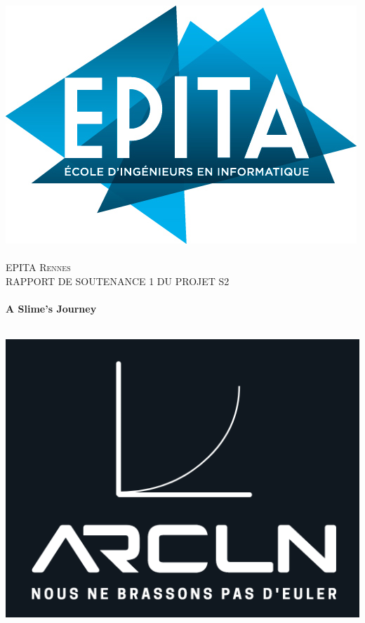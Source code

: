 
\begin{titlepage}
  \begin{sffamily}
  \begin{center}

  
    \includegraphics[scale=0.3]{logo}~\\[1.5cm]

    \textsc{\LARGE EPITA Rennes}\\[0.5cm]

    \textsc{\Large RAPPORT DE SOUTENANCE 1 DU PROJET S2}\\[1.5cm]

    \HRule \\[0.4cm]
     { \huge \bfseries  A Slime's Journey \\[0.4cm] }

    \HRule \\[2cm]
    \includegraphics[scale=0.4]{arcln}
     \\[0.5cm]


\end{center}
\end{sffamily}
\end{titlepage}
